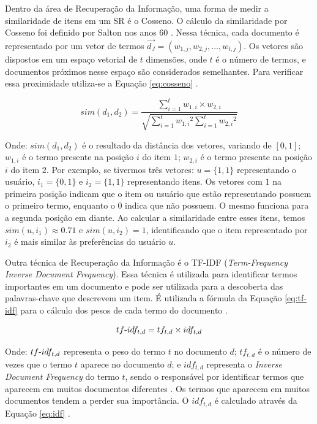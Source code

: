 Dentro da área de Recuperação da Informação, uma forma de medir a similaridade de itens em um SR é o Cosseno. O cálculo
da similaridade por Cosseno foi definido por Salton nos anos 60 \cite{salton1964document}. Nessa técnica, cada documento
é representado por um vetor de termos $\vec{d_J} = (w_{1,j}, w_{2,j}, ..., w_{t,j})$. Os vetores são dispostos em um
espaço vetorial de $t$ dimensões, onde $t$ é o número de termos, e documentos próximos nesse espaço são considerados
semelhantes. Para verificar essa proximidade utiliza-se a Equação \ref{eq:cosseno} \cite{christopher2008introduction}.

\begin{equation}
  sim(d_1, d_2) = \frac{\sum_{i=1}^{t}{w_{1,i} \times w_{2,i}}}{\sqrt{\sum_{i=1}^{t}{w_{1,i}}^2 \sum_{i=1}^{t}{w_{2,i}}^2}}
  \label{eq:cosseno}
\end{equation}


Onde: $sim(d_1, d_2)$ é o resultado da distância dos vetores, variando de $[0,1]$; $w_{1,i}$ é o termo presente na
posição $i$ do item $1$; $w_{2,i}$ é o termo presente na posição $i$ do item $2$. Por exemplo, se tivermos três vetores: $u = \{1,1\}$
representando o usuário, $i_1 = \{0, 1\}$ e $i_2 = \{1, 1\}$ representando itens. Os vetores com $1$ na primeira posição
indicam que o item ou usuário que estão representando possuem o primeiro termo, enquanto o $0$ indica que não possuem. O mesmo
funciona para a segunda posição em diante. Ao calcular a similaridade entre esses itens, temos $sim(u, i_1) \approx 0.71$
e $sim(u, i_2) = 1$, identificando que o item representado por $i_2$ é mais similar às preferências do usuário $u$.

Outra técnica de Recuperação da Informação é o TF-IDF (\textit{Term-Frequency Inverse Document Frequency}). Essa técnica
é utilizada para identificar termos importantes em um documento \cite{christopher2008introduction} e pode ser utilizada
para a descoberta das palavras-chave que descrevem um item. É utilizada a fórmula da Equação \ref{eq:tf-idf} para o cálculo dos
pesos de cada termo do documento \cite{christopher2008introduction}.

\begin{equation}
  tf\hbox{-}idf_{t,d} = tf_{t,d} \times idf_{t,d}
  \label{eq:tf-idf}
\end{equation}

Onde: $tf\hbox{-}idf_{t,d}$ representa o peso do termo $t$ no documento $d$; $tf_{t,d}$ é o número de vezes que o termo
$t$ aparece no documento $d$; e $idf_{t,d}$ representa o \textit{Inverse Document Frequency} do termo $t$, sendo o responsável por
identificar termos que aparecem em muitos documentos diferentes \cite{christopher2008introduction}. Os termos que aparecem em muitos
documentos tendem a perder sua importância. O $idf_{t,d}$ é calculado através da Equação \ref{eq:idf} \cite{christopher2008introduction}.

